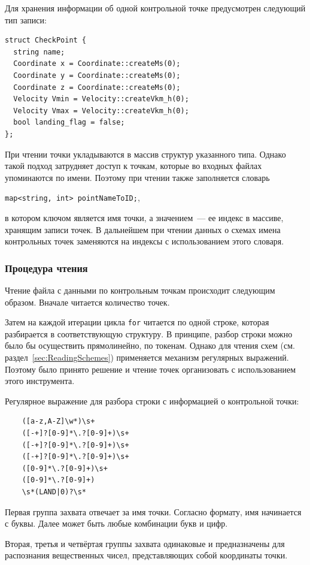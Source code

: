 \documentclass[12pt]{article}
\theoremstyle{plain}
\begin{document}
Для хранения информации об одной контрольной точке предусмотрен следующий тип записи:

\begin{verbatim}
struct CheckPoint {
  string name;
  Coordinate x = Coordinate::createMs(0);
  Coordinate y = Coordinate::createMs(0);
  Coordinate z = Coordinate::createMs(0);
  Velocity Vmin = Velocity::createVkm_h(0);
  Velocity Vmax = Velocity::createVkm_h(0);
  bool landing_flag = false;
};
\end{verbatim}

При чтении точки укладываются в массив структур указанного типа. Однако такой подход затрудняет доступ к точкам, которые во входных файлах упоминаются по имени. Поэтому при чтении также заполняется словарь\\
\centerline{\texttt{map<string, int> pointNameToID;},}
в котором ключом является имя точки, а значением~--- ее индекс в массиве, хранящим записи точек. В дальнейшем при чтении данных о схемах имена контрольных точек заменяются на индексы с использованием этого словаря.


\subsubsection{Процедура чтения}

Чтение файла с данными по контрольным точкам происходит следующим образом. Вначале читается количество точек. 

Затем на каждой итерации цикла \texttt{for} читается по одной строке, которая разбирается в соответствующую структуру. В принципе, разбор строки можно было бы осуществить прямолинейно, по токенам. Однако для чтения схем (см. раздел~\ref{sec:ReadingSchemes}) применяется механизм регулярных выражений. Поэтому было принято решение и чтение точек организовать с использованием этого инструмента. 

Регулярное выражение для разбора строки с информацией о контрольной точки:
\begin{verbatim}
    ([a-z,A-Z]\w*)\s+
    ([-+]?[0-9]*\.?[0-9]+)\s+
    ([-+]?[0-9]*\.?[0-9]+)\s+
    ([-+]?[0-9]*\.?[0-9]+)\s+
    ([0-9]*\.?[0-9]+)\s+
    ([0-9]*\.?[0-9]+)
    \s*(LAND|0)?\s*
\end{verbatim}

Первая группа захвата отвечает за имя точки. Согласно формату, имя начинается с буквы. Далее может быть любые комбинации букв и цифр.

Вторая, третья и четвёртая группы захвата одинаковые и предназначены для распознания вещественных чисел, представляющих собой координаты точки.
\end{document}
